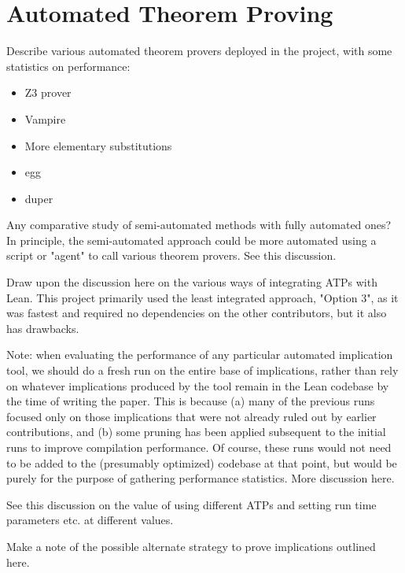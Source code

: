 \section{Automated Theorem Proving}\label{automated-sec}


Describe various automated theorem provers deployed in the project, with some statistics on performance:

\begin{itemize}
    \item Z3 prover
    \item Vampire
    \item More elementary substitutions
    \item egg
    \item duper
\end{itemize}

Any comparative study of semi-automated methods with fully automated ones? In principle, the semi-automated approach could be more automated using a script or "agent" to call various theorem provers. See this discussion.

Draw upon the discussion here on the various ways of integrating ATPs with Lean. This project primarily used the least integrated approach, "Option 3", as it was fastest and required no dependencies on the other contributors, but it also has drawbacks.

Note: when evaluating the performance of any particular automated implication tool, we should do a fresh run on the entire base of implications, rather than rely on whatever implications produced by the tool remain in the Lean codebase by the time of writing the paper. This is because (a) many of the previous runs focused only on those implications that were not already ruled out by earlier contributions, and (b) some pruning has been applied subsequent to the initial runs to improve compilation performance. Of course, these runs would not need to be added to the (presumably optimized) codebase at that point, but would be purely for the purpose of gathering performance statistics. More discussion here.

See this discussion on the value of using different ATPs and setting run time parameters etc. at different values.

Make a note of the possible alternate strategy to prove implications outlined here.
